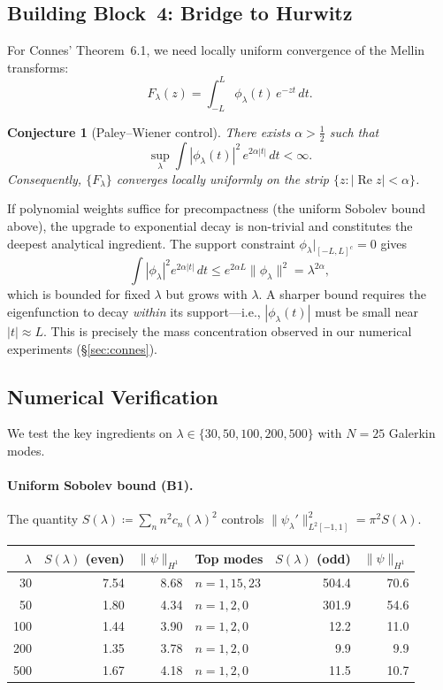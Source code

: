 \documentclass[12pt,a4paper]{article}
\newtheorem{conjecture}[theorem]{Conjecture}
\theoremstyle{definition}
\theoremstyle{remark}
\begin{document}
\subsection{Building Block~4: Bridge to Hurwitz}

For Connes' Theorem~6.1, we need locally uniform convergence of the Mellin transforms:
\[
  F_\lambda(z) = \int_{-L}^{L} \phi_\lambda(t)\,e^{-zt}\,dt.
\]

\begin{conjecture}[Paley--Wiener control]
\label{conj:pw}
There exists $\alpha > \tfrac{1}{2}$ such that
\[
  \sup_\lambda \int |\phi_\lambda(t)|^2\,e^{2\alpha|t|}\,dt < \infty.
\]
Consequently, $\{F_\lambda\}$ converges locally uniformly on the strip
$\{z : |\operatorname{Re} z| < \alpha\}$.
\end{conjecture}

If polynomial weights suffice for precompactness (the uniform Sobolev bound above), the upgrade to exponential decay is non-trivial and constitutes the deepest analytical ingredient. The support constraint $\phi_\lambda|_{[-L,L]^c} = 0$ gives
\[
  \int |\phi_\lambda|^2 e^{2\alpha|t|}\,dt \leq e^{2\alpha L}\|\phi_\lambda\|^2 = \lambda^{2\alpha},
\]
which is bounded for fixed $\lambda$ but grows with $\lambda$. A sharper bound requires the eigenfunction to decay \emph{within} its support---i.e., $|\phi_\lambda(t)|$ must be small near $|t| \approx L$. This is precisely the mass concentration observed in our numerical experiments (\S\ref{sec:connes}).

\subsection{Numerical Verification}
\label{sec:wc-numerics}

We test the key ingredients on $\lambda \in \{30, 50, 100, 200, 500\}$ with $N = 25$ Galerkin modes.

\paragraph{Uniform Sobolev bound (B1).}
The quantity $S(\lambda) \coloneqq \sum_{n} n^2 c_n(\lambda)^2$ controls $\|\psi_\lambda'\|_{L^2[-1,1]}^2 = \pi^2 S(\lambda)$.

\begin{center}
\small
\renewcommand{\arraystretch}{1.15}
\begin{tabular}{r|r|r|l||r|r}
$\lambda$ & $S(\lambda)$ (even) & $\|\psi\|_{H^1}$ & Top modes & $S(\lambda)$ (odd) & $\|\psi\|_{H^1}$ \\\hline
30  & 7.54  & 8.68  & $n = 1,15,23$ & 504.4  & 70.6 \\
50  & 1.80  & 4.34  & $n = 1,2,0$   & 301.9  & 54.6 \\
100 & 1.44  & 3.90  & $n = 1,2,0$   & 12.2   & 11.0 \\
200 & 1.35  & 3.78  & $n = 1,2,0$   & 9.9    & 9.9  \\
500 & 1.67  & 4.18  & $n = 1,2,0$   & 11.5   & 10.7
\end{tabular}
\end{center}
\end{document}
